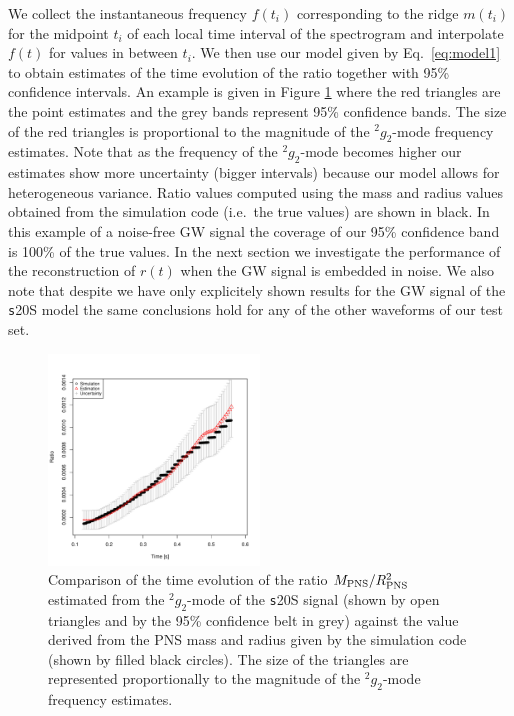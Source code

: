 We collect the instantaneous frequency $f(t_i)$ corresponding to the ridge $m(t_i)$ for
the midpoint $t_i$ of each local time interval of the spectrogram and interpolate $f(t)$
for values in between $t_i$. We then use our model given by Eq.~\eqref{eq:model1} to obtain
estimates of the time evolution of the ratio together with 95\% confidence intervals.
An example is given in Figure \ref{fig:ratio} where the red triangles are the point estimates and
the grey bands represent 95\% confidence bands. The size of the red triangles is proportional to the magnitude of the $\mbox{}^2 g_2$-mode frequency estimates.
Note that as the frequency of the $\mbox{}^2 g_2$-mode becomes higher our estimates show more uncertainty (bigger intervals) because our model allows for heterogeneous variance. Ratio values
computed using the mass and radius values obtained from the simulation code (i.e.~the true values)
are shown in black. In this example of a noise-free GW signal the coverage of our 95\% confidence band is 100\%
of the true values. In the next section we investigate the performance of the reconstruction of $r(t)$ when the GW
signal is embedded in noise. We also note that despite we have only explicitely shown results for the GW signal of the {\texttt s20S} model the same conclusions hold for any of the other waveforms of our test set.

\begin{figure}
 \centering
 \includegraphics[width=0.5\textwidth]{plots/ratio}
 \caption{Comparison of the time evolution of the ratio $M_{\rm PNS}/R_{\rm PNS}^2$ estimated from the $\mbox{}^2 g_2$-mode of the {\texttt s20S} signal (shown by open triangles and by the 95\% confidence belt in grey) against the value derived from the PNS mass and radius given by the simulation code (shown by filled black circles). The size of the triangles are represented proportionally to the magnitude of the $\mbox{}^2 g_2$-mode frequency estimates.}
 \label{fig:ratio}
\end{figure}


